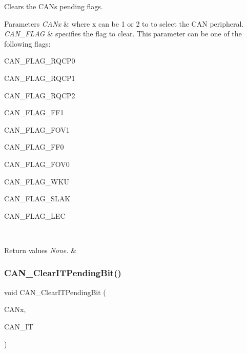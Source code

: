Clears the C\+AN\textquotesingle{}s pending flags. 


\begin{DoxyParams}{Parameters}
{\em C\+A\+Nx} & where x can be 1 or 2 to to select the C\+AN peripheral. \\
\hline
{\em C\+A\+N\+\_\+\+F\+L\+AG} & specifies the flag to clear. This parameter can be one of the following flags\+:
\begin{DoxyItemize}
\item C\+A\+N\+\_\+\+F\+L\+A\+G\+\_\+\+R\+Q\+C\+P0
\item C\+A\+N\+\_\+\+F\+L\+A\+G\+\_\+\+R\+Q\+C\+P1
\item C\+A\+N\+\_\+\+F\+L\+A\+G\+\_\+\+R\+Q\+C\+P2
\item C\+A\+N\+\_\+\+F\+L\+A\+G\+\_\+\+F\+F1
\item C\+A\+N\+\_\+\+F\+L\+A\+G\+\_\+\+F\+O\+V1
\item C\+A\+N\+\_\+\+F\+L\+A\+G\+\_\+\+F\+F0
\item C\+A\+N\+\_\+\+F\+L\+A\+G\+\_\+\+F\+O\+V0
\item C\+A\+N\+\_\+\+F\+L\+A\+G\+\_\+\+W\+KU
\item C\+A\+N\+\_\+\+F\+L\+A\+G\+\_\+\+S\+L\+AK
\item C\+A\+N\+\_\+\+F\+L\+A\+G\+\_\+\+L\+EC
\end{DoxyItemize}\\
\hline
\end{DoxyParams}

\begin{DoxyRetVals}{Return values}
{\em None.} & \\
\hline
\end{DoxyRetVals}
\mbox{\label{group___c_a_n___private___functions_ga30bf7ac0c1793f6622a4a1adbb7dbc8a}} 
\subsubsection{\texorpdfstring{CAN\_ClearITPendingBit()}{CAN\_ClearITPendingBit()}}
{\footnotesize\ttfamily void C\+A\+N\+\_\+\+Clear\+I\+T\+Pending\+Bit (\begin{DoxyParamCaption}\item[{\mbox{\hyperlink{struct_c_a_n___type_def}{C\+A\+N\+\_\+\+Type\+Def}} $\ast$}]{C\+A\+Nx,  }\item[{uint32\+\_\+t}]{C\+A\+N\+\_\+\+IT }\end{DoxyParamCaption})}



